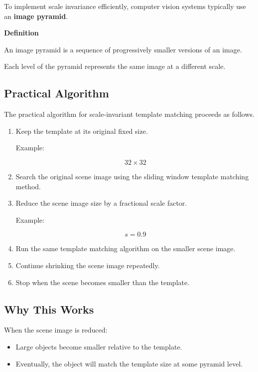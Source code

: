 \documentclass[12pt]{article}
\begin{document}
To implement scale invariance efficiently, computer vision systems typically use an \textbf{image pyramid}.

\textbf{Definition}

An image pyramid is a sequence of progressively smaller versions of an image.

Each level of the pyramid represents the same image at a different scale.

\subsection{Practical Algorithm}

The practical algorithm for scale-invariant template matching proceeds as follows.

\begin{enumerate}

    \item Keep the template at its original fixed size.

          Example:

          \[
              32 \times 32
          \]

    \item Search the original scene image using the sliding window template matching method.

    \item Reduce the scene image size by a fractional scale factor.

          Example:

          \[
              s = 0.9
          \]

    \item Run the same template matching algorithm on the smaller scene image.

    \item Continue shrinking the scene image repeatedly.

    \item Stop when the scene becomes smaller than the template.

\end{enumerate}

\subsection{Why This Works}

When the scene image is reduced:

\begin{itemize}
    \item Large objects become smaller relative to the template.
    \item Eventually, the object will match the template size at some pyramid level.
\end{itemize}
\end{document}
